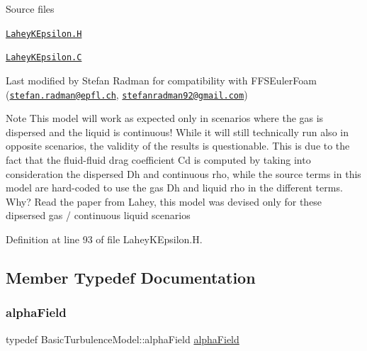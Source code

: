 \begin{DoxyParagraph}{Source files}

\begin{DoxyItemize}
\item \href{../../../home/carlo/data/GeN-Foam/GeN-Foam_ffn/GeN-Foam/GeN-Foam/classes/thermalHydraulics/src/physicsModels/turbulenceModels/LaheyKEpsilon/LaheyKEpsilon.H}{\tt Lahey\+K\+Epsilon.\+H} 
\item \href{../../../home/carlo/data/GeN-Foam/GeN-Foam_ffn/GeN-Foam/GeN-Foam/classes/thermalHydraulics/src/physicsModels/turbulenceModels/LaheyKEpsilon/LaheyKEpsilon.C}{\tt Lahey\+K\+Epsilon.\+C} 
\end{DoxyItemize}Last modified by Stefan Radman for compatibility with F\+F\+S\+Euler\+Foam (\href{mailto:stefan.radman@epfl.ch}{\tt stefan.\+radman@epfl.\+ch}, \href{mailto:stefanradman92@gmail.com}{\tt stefanradman92@gmail.\+com})
\end{DoxyParagraph}
\begin{DoxyNote}{Note}
This model will work as expected only in scenarios where the gas is dispersed and the liquid is continuous! While it will still technically run also in opposite scenarios, the validity of the results is questionable. This is due to the fact that the fluid-\/fluid drag coefficient Cd is computed by taking into consideration the dispersed Dh and continuous rho, while the source terms in this model are hard-\/coded to use the gas Dh and liquid rho in the different terms. Why? Read the paper from Lahey, this model was devised only for these dipsersed gas / continuous liquid scenarios 
\end{DoxyNote}


Definition at line 93 of file Lahey\+K\+Epsilon.\+H.



\subsection{Member Typedef Documentation}
\mbox{\label{classFoam_1_1RASModels_1_1LaheyKEpsilon_a06a66094f33d6817d19225445c5ea874}} 
\subsubsection{\texorpdfstring{alpha\+Field}{alphaField}}
{\footnotesize\ttfamily typedef Basic\+Turbulence\+Model\+::alpha\+Field \hyperlink{classFoam_1_1RASModels_1_1LaheyKEpsilon_a06a66094f33d6817d19225445c5ea874}{alpha\+Field}}



